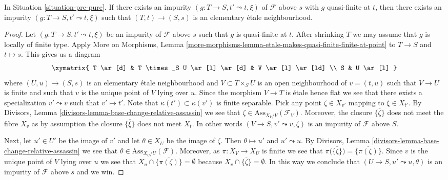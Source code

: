 \begin{lemma}
\label{lemma-quasi-finite-impurity-elementary}
In Situation \ref{situation-pre-pure}.
If there exists an impurity $(g : T \to S, t' \leadsto t, \xi)$
of $\mathcal{F}$ above $s$ with $g$ quasi-finite at $t$, then there
exists an impurity $(g : T \to S, t' \leadsto t, \xi)$ such that
$(T, t) \to (S, s)$ is an elementary \'etale neighbourhood.
\end{lemma}

\begin{proof}
Let $(g : T \to S, t' \leadsto t, \xi)$ be an impurity of
$\mathcal{F}$ above $s$ such that $g$ is quasi-finite at $t$.
After shrinking $T$ we may assume that $g$ is locally of finite type.
Apply
More on Morphisms,
Lemma \ref{more-morphisms-lemma-etale-makes-quasi-finite-finite-at-point}
to $T \to S$ and $t \mapsto s$. This gives us a diagram
$$
\xymatrix{
T \ar[d] & T \times_S U \ar[l] \ar[d] & V \ar[l] \ar[ld] \\
S & U \ar[l]
}
$$
where $(U, u) \to (S, s)$ is an elementary \'etale neighbourhood
and $V \subset T \times_S U$ is an open neighbourhood of $v = (t, u)$
such that $V \to U$ is finite and such that $v$ is the unique point of $V$
lying over $u$. Since the morphism $V \to T$ is \'etale
hence flat we see that there exists a specialization $v' \leadsto v$ such
that $v' \mapsto t'$. Note that $\kappa(t') \subset \kappa(v')$
is finite separable. Pick any point $\zeta \in X_{v'}$ mapping to
$\xi \in X_{t'}$. By
Divisors, Lemma \ref{divisors-lemma-base-change-relative-assassin}
we see that $\zeta \in \text{Ass}_{X_V/V}(\mathcal{F}_V)$.
Moreover, the closure $\overline{\{\zeta\}}$ does not meet
the fibre $X_v$ as by assumption the closure $\overline{\{\xi\}}$
does not meet $X_t$. In other words $(V \to S, v' \leadsto v, \zeta)$
is an impurity of $\mathcal{F}$ above $S$.

\medskip\noindent
Next, let $u' \in U'$ be the image of $v'$ and let
$\theta \in X_U$ be the image of $\zeta$.
Then $\theta \mapsto u'$ and $u' \leadsto u$.
By
Divisors, Lemma \ref{divisors-lemma-base-change-relative-assassin}
we see that $\theta \in \text{Ass}_{X_U/U}(\mathcal{F})$.
Moreover, as $\pi : X_V \to X_U$ is finite we see that
$\pi\big(\overline{\{\zeta\}}\big) = \overline{\{\pi(\zeta)\}}$. Since
$v$ is the unique point of $V$ lying over $u$ we see that
$X_u \cap \overline{\{\pi(\zeta)\}} = \emptyset$ because
$X_v \cap \overline{\{\zeta\}} = \emptyset$. In this way we conclude that
$(U \to S, u' \leadsto u, \theta)$ is an impurity of
$\mathcal{F}$ above $s$ and we win.
\end{proof}

